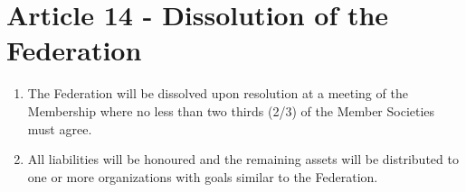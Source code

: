 \section{Article 14 - Dissolution of the Federation}
\label{article-14-dissolution-of-the-federation}

\begin{enumerate}
 \item The Federation will be dissolved upon resolution at a meeting of the Membership where no less than two thirds (2/3) of the Member Societies must agree.
 \item All liabilities will be honoured and the remaining assets will be distributed to one or more organizations with goals similar to the Federation.
\end{enumerate}
